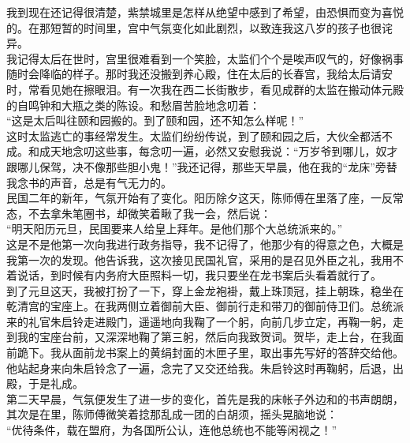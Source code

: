 我到现在还记得很清楚，紫禁城里是怎样从绝望中感到了希望，由恐惧而变为喜悦的。在那短暂的时间里，宫中气氛变化如此剧烈，以致连我这八岁的孩子也很诧异。\\

我记得太后在世时，宫里很难看到一个笑脸，太监们个个是唉声叹气的，好像祸事随时会降临的样子。那时我还没搬到养心殿，住在太后的长春宫，我给太后请安时，常看见她在擦眼泪。有一次我在西二长街散步，看见成群的太监在搬动体元殿的自鸣钟和大瓶之类的陈设。和愁眉苦脸地念叨着：\\

“这是太后叫往颐和园搬的。到了颐和园，还不知怎么样呢！”\\

这时太监逃亡的事经常发生。太监们纷纷传说，到了颐和园之后，大伙全都活不成。和成天地念叨这些事，每念叨一遍，必然又安慰我说：“万岁爷到哪儿，奴才跟哪儿保驾，决不像那些胆小鬼！”我还记得，那些天早晨，他在我的“龙床”旁替我念书的声音，总是有气无力的。\\

民国二年的新年，气氛开始有了变化。阳历除夕这天，陈师傅在里落了座，一反常态，不去拿朱笔圈书，却微笑着瞅了我一会，然后说：\\

“明天阳历元旦，民国要来人给皇上拜年。是他们那个大总统派来的。”\\

这是不是他第一次向我进行政务指导，我不记得了，他那少有的得意之色，大概是我第一次的发现。他告诉我，这次接见民国礼官，采用的是召见外臣之礼，我用不着说话，到时候有内务府大臣照料一切，我只要坐在龙书案后头看着就行了。\\

到了元旦这天，我被打扮了一下，穿上金龙袍褂，戴上珠顶冠，挂上朝珠，稳坐在乾清宫的宝座上。在我两侧立着御前大臣、御前行走和带刀的御前侍卫们。总统派来的礼官朱启铃走进殿门，遥遥地向我鞠了一个躬，向前几步立定，再鞠一躬，走到我的宝座台前，又深深地鞠了第三躬，然后向我致贺词。贺毕，走上台，在我面前跪下。我从面前龙书案上的黄绢封面的木匣子里，取出事先写好的答辞交给他。他站起身来向朱启铃念了一遍，念完了又交还给我。朱启铃这时再鞠躬，后退，出殿，于是礼成。\\

第二天早晨，气氛便发生了进一步的变化，首先是我的床帐子外边和的书声朗朗，其次是在里，陈师傅微笑着捻那乱成一团的白胡须，摇头晃脑地说：\\

“优待条件，载在盟府，为各国所公认，连他总统也不能等闲视之！”\\

